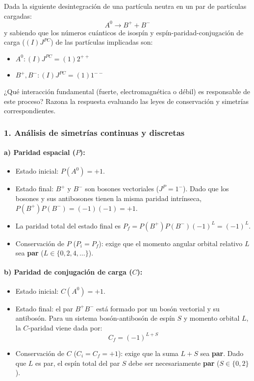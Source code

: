 \begin{problema}
Dada la siguiente desintegración de una partícula neutra en un par de partículas cargadas:
\begin{equation*}
A^0 \longrightarrow B^+ + B^-
\end{equation*}
y sabiendo que los números cuánticos de isospín y espín-paridad-conjugación de carga ($(I)J^{PC}$) de las partículas implicadas son:
\begin{itemize}
    \item $A^0: (I)J^{PC} = (1)2^{++}$
    \item $B^+, B^-: (I)J^{PC} = (1)1^{--}$
\end{itemize}
¿Qué interacción fundamental (fuerte, electromagnética o débil) es responsable de este proceso? Razona la respuesta evaluando las leyes de conservación y simetrías correspondientes.

\tcblower

\subsubsection*{1. Análisis de simetrías continuas y discretas}

\paragraph{a) Paridad espacial ($P$):}
\begin{itemize}
    \item Estado inicial: $P(A^0) = +1$.
    \item Estado final: $B^+$ y $B^-$ son bosones vectoriales ($J^P = 1^-$). Dado que los bosones y sus antibosones tienen la misma paridad intrínseca, $P(B^+) P(B^-) = (-1)(-1) = +1$.
    \item La paridad total del estado final es $P_f = P(B^+) P(B^-) (-1)^L = (-1)^L$.
    \item Conservación de $P$ ($P_i = P_f$): exige que el momento angular orbital relativo $L$ sea \textbf{par} ($L \in \{0, 2, 4, \dots\}$).
\end{itemize}

\paragraph{b) Paridad de conjugación de carga ($C$):}
\begin{itemize}
    \item Estado inicial: $C(A^0) = +1$.
    \item Estado final: el par $B^+ B^-$ está formado por un bosón vectorial y su antibosón. Para un sistema bosón-antibosón de espín $S$ y momento orbital $L$, la $C$-paridad viene dada por:
    \begin{equation*}
    C_f = (-1)^{L+S}
    \end{equation*}
    \item Conservación de $C$ ($C_i = C_f = +1$): exige que la suma $L+S$ sea \textbf{par}. Dado que $L$ es par, el espín total del par $S$ debe ser necesariamente \textbf{par} ($S \in \{0, 2\}$).
\end{itemize}


\end{problema}
